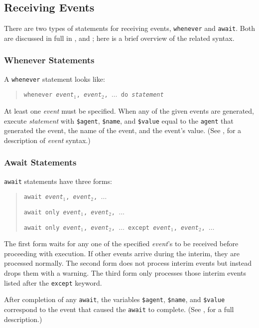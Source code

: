 \subsection{Receiving Events}

There are two types of statements for receiving events, {\tt whenever}
and {\tt await}.  Both are discussed in full in , and
; here is a brief overview of the related syntax.

\subsubsection{Whenever Statements}
\label{whenever-stmt}

A {\tt whenever} statement looks like:
\begin{quote}
    {\tt whenever {\em event$_1$}, {\em event$_2$}, $\ldots$ do {\em statement}}
\end{quote}
At least
one {\em event} must be specified.  When any of the given events 
are generated, execute {\em
statement} with {\tt \$agent}, {\tt \$name}, and {\tt \$value} equal
to the {\tt agent} that generated the event, the name of the event,
and the event's value. (See , for a description of {\em event} syntax.)  

\subsubsection{Await Statements}
\label{await-statement}

{\tt await} statements have three forms:
\begin{quote}
    {\tt await {\em event$_1$}, {\em event$_2$}, $\ldots$}

    {\tt await only {\em event$_1$}, {\em event$_2$}, $\ldots$}

    {\tt await only {\em event$_1$}, {\em event$_2$}, $\ldots$ except {\em event$_1$}, {\em event$_2$}, $\ldots$}
\end{quote}
The first form waits for any one of the specified {\em event\/}'s to be
received before proceeding with execution.
If other events arrive during the interim, they are processed normally.
The second form does not process interim events but instead drops
them with a warning.  The third form only processes those interim events
listed after the {\tt except} keyword.

After completion of any {\tt await}, the variables {\tt \$agent}, {\tt \$name},
and {\tt \$value} correspond to the event that caused the {\tt await} to complete.
(See , for a full description.)

